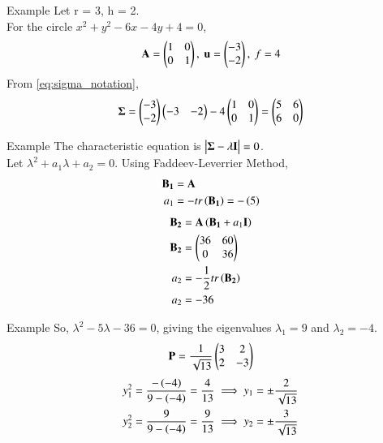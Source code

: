 \documentclass{beamer}
\begin{document}
\begin{frame}{Example}
Let r = 3, h = 2. \\
For the circle $x^2+y^2-6x-4y+4=0$,
\begin{align}
    \mathbf{A} = \begin{pmatrix}1 & 0 \\ 0 & 1\end{pmatrix},\text{ }\mathbf{u} = \begin{pmatrix}-3 \\ -2\end{pmatrix},\text{ }f = 4
\end{align}
From \eqref{eq:sigma_notation},
\begin{align}
    \mathbf{\Sigma} = \begin{pmatrix}-3 \\ -2\end{pmatrix}\begin{pmatrix}-3 & -2\end{pmatrix} - 4\begin{pmatrix}1 & 0 \\ 0 & 1\end{pmatrix} = \begin{pmatrix}5 & 6 \\ 6 & 0\end{pmatrix}
\end{align}
\end{frame}

\begin{frame}{Example}
The characteristic equation is $\begin{vmatrix}\mathbf{\Sigma}-\lambda\mathbf{I}\end{vmatrix}=0$. \\
Let $\lambda^2 + a_1 \lambda + a_2 = 0$. Using Faddeev-Leverrier Method,
\begin{align}
    \mathbf{B_1} &= \mathbf{A} \\
    a_1 &= - tr\left(\mathbf{B_1}\right) = -\left(5\right)
\end{align}
\begin{align}
    \mathbf{B_2} &= \mathbf{A}\left(\mathbf{B_1} + a_1\mathbf{I}\right) \\
    \mathbf{B_2} &= \begin{pmatrix}36 & 60 \\ 0 & 36\end{pmatrix} \\
    a_2 &= -\frac{1}{2}tr\left(\mathbf{B_2}\right) \\
    a_2 &= -36
\end{align}
\end{frame}

\begin{frame}{Example}
So, $\lambda^2 - 5\lambda - 36 = 0$, giving the eigenvalues $\lambda_1 = 9$ and $\lambda_2 = -4$.
\begin{align}
    \mathbf{P} = \frac{1}{\sqrt{13}}\begin{pmatrix}3 & 2 \\ 2 & -3\end{pmatrix}
\end{align}
\begin{align}
    y_1^2 = \frac{-\left(-4\right)}{9-\left(-4\right)} = \frac{4}{13} \implies y_1 = \pm\frac{2}{\sqrt{13}} \\
    y_2^2 = \frac{9}{9-\left(-4\right)} = \frac{9}{13} \implies y_2 = \pm\frac{3}{\sqrt{13}}
\end{align}
\end{frame}
\end{document}
